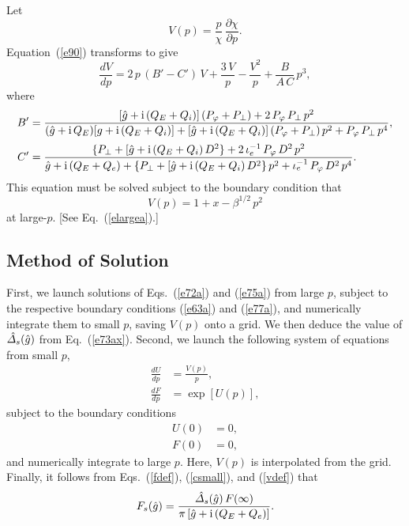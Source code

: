 \documentclass[12pt,prb,aps]{revtex4-1}
\begin{document}
Let 
\begin{equation}\label{vdef}
V(p)= \frac{p}{\chi}\,\frac{\partial\chi}{\partial p}.
\end{equation}
Equation~(\ref{e90}) transforms to give 
\begin{equation}\label{e75a}
\frac{dV}{dp} = 2\,p\,(B'-C')\,V + \frac{3\,V}{p} - \frac{V^2}{p} + \frac{B}{A\,C}\,p^3,
\end{equation}
where 
\begin{align}
B' &= \frac{ [\hat{g}+{\rm i}\,(Q_E+Q_i)]\,(P_\varphi+P_\perp)+ 2\,P_\varphi\,P_\perp\,p^2}{ (\hat{g}+{\rm i}\,Q_E)[g+{\rm i}\,(Q_E+Q_i)] + [\hat{g}+{\rm i}\,(Q_E+Q_i)]\,(P_\varphi+P_\perp)\,p^2+ P_\varphi\,P_\perp\,p^4},\\[0.5ex]
C'&=\frac{\{P_\perp + [\hat{g}+{\rm i}\,(Q_E+Q_i)\,D^2\}+ 2\,\iota_e^{-1}\,P_\varphi\,D^2\,p^2}{\hat{g} + {\rm i}\,(Q_E+Q_e) +\{P_\perp + [\hat{g}+{\rm i}\,(Q_E+Q_i)\,D^2\}\,p^2 + \iota_e^{-1}\,P_\varphi\,D^2\,p^4}.
\end{align}
This equation must be solved subject to the boundary condition that
\begin{equation}\label{e77a}
V(p) = 1+x-\beta^{1/2}\,p^2
\end{equation}
at large-$p$. [See Eq.~(\ref{elargea}).] 

\subsection{Method of Solution}
First, we launch solutions of Eqs.~(\ref{e72a}) and (\ref{e75a}) from large $p$, subject to the respective boundary conditions (\ref{e63a}) and (\ref{e77a}), and
numerically integrate them to small $p$,  saving $V(p)$ onto a grid. We then deduce the value of $\hat{\mit\Delta}_s(\hat{g})$ from Eq.~(\ref{e73ax}). 
Second, we launch the following system of equations from small $p$, 
\begin{align}
\frac{dU}{dp} &= \frac{V(p)}{p},\\[0.5ex]
\frac{dF}{dp} &=\exp[U(p)],
\end{align}
subject to the boundary conditions
\begin{align}
U(0) &=0,\\[0.5ex]
F(0) &= 0,
\end{align}
and numerically  integrate to large $p$. Here, $V(p)$ is interpolated from the grid. 
Finally,  it follows from Eqs.~(\ref{fdef}), (\ref{csmall}), and (\ref{vdef}) that 
\begin{equation}
F_s(\hat{g}) = \frac{\hat{\mit\Delta}_s(\hat{g})\,F(\infty)}{\pi\,[\hat{g}+{\rm i}\,(Q_E+Q_e)]}.
\end{equation}
\end{document}
